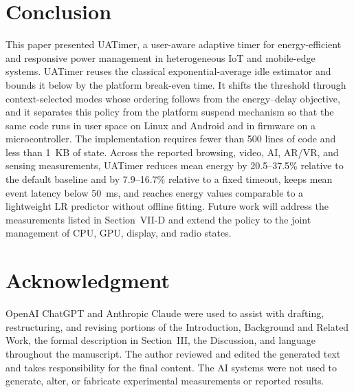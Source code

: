 \documentclass[journal]{IEEEtran}
\begin{document}
\section{Conclusion}
This paper presented UATimer, a user-aware adaptive timer for energy-efficient and responsive power management in heterogeneous IoT and mobile-edge systems. UATimer reuses the classical exponential-average idle estimator and bounds it below by the platform break-even time. It shifts the threshold through context-selected modes whose ordering follows from the energy--delay objective, and it separates this policy from the platform suspend mechanism so that the same code runs in user space on Linux and Android and in firmware on a microcontroller. The implementation requires fewer than 500 lines of code and less than 1~KB of state. Across the reported browsing, video, AI, AR/VR, and sensing measurements, UATimer reduces mean energy by 20.5--37.5\% relative to the default baseline and by 7.9--16.7\% relative to a fixed timeout, keeps mean event latency below 50~ms, and reaches energy values comparable to a lightweight LR predictor without offline fitting. Future work will address the measurements listed in Section~VII-D and extend the policy to the joint management of CPU, GPU, display, and radio states.

\section*{Acknowledgment}
OpenAI ChatGPT and Anthropic Claude were used to assist with drafting, restructuring, and revising portions of the Introduction, Background and Related Work, the formal description in Section~III, the Discussion, and language throughout the manuscript. The author reviewed and edited the generated text and takes responsibility for the final content. The AI systems were not used to generate, alter, or fabricate experimental measurements or reported results.
\end{document}
